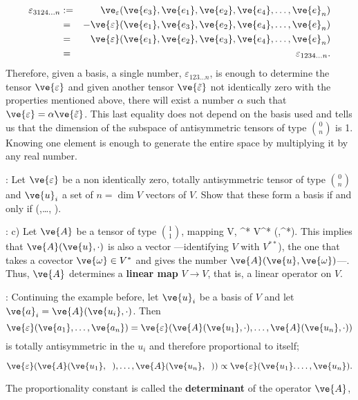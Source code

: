 \begin{eqnarray*} 
\varepsilon_{3124\ldots n} &:=& \ve_{\varepsilon}(\ve{e_3},\ve{e_1}, \ve{e_{2}}, \ve{e_{4}},\ldots,\ve{e}_n) \\
&=& -\ve{\varepsilon}(\ve{e_1},\ve{e_3}, \ve{e_{2}}, \ve{e_{4}},\ldots,\ve{e}_n) \\ 
&=& \ve{\varepsilon}(\ve{e_1},\ve{e_2}, \ve{e_{3}}, \ve{e_{4}},\ldots,\ve{e}_n) \\
&=&\varepsilon_{1234\ldots n}. 
\end{eqnarray*} 
% 
Therefore, given a basis, a single number, $\varepsilon_{123\ldots n}$, is enough to determine the tensor $\ve{\varepsilon}$ and given another tensor $\ve{\tilde{\varepsilon} }$ not identically zero with the properties mentioned above, there will exist a number $\alpha$ such that $\ve{\varepsilon} = \alpha\ve{\tilde{\varepsilon}}$. This last equality does not depend on the basis used and tells us that the dimension of the subspace of antisymmetric tensors of type ${0 \choose n}$ is 1. Knowing one element is enough to generate the entire space by multiplying it by any real number.

\ejer: Let $\ve{\varepsilon}$ be a non identically zero, totally antisymmetric tensor of type ${0 \choose n}$ and ${\ve{u}_i}$ a set of $n=\dim V$ vectors of $V$. Show that these form a basis if and only if 
\beq 
\ve{\varepsilon} (,\ldots, ). 
\eeq

\ejem: c) Let $\ve{ A}$ be a tensor of type ${1 \choose 1}$, mapping
\beq
{}\in V, \;\; ^* \in V^* \to {}(,^*)\in\re. 
\eeq 
This implies that $\ve{A}(\ve{u},\cdot)$ is also a vector ---identifying $V$ with $V^{**}$), the one that takes a covector $\ve{\omega} \in V^*$ and gives the number $\ve{A}(\ve{u},\ve{\omega})$---. 
Thus, $\ve{A}$ determines a \textbf{linear map} $V \to V$, that is, a linear operator on $V$.

\ejer: Continuing the example before, let ${\ve{u}_i}$ be a basis of $V$ and let $\ve{ a}_i = \ve{A}(\ve{u_i},\cdot)$. Then \[ \ve{\varepsilon}(\ve{a_1},\ldots,\ve{a_n})=\ve{\varepsilon}(\ve{A}(\ve{u_1}, \cdot),\ldots ,\ve{A}(\ve{u_n},\cdot)) \] is totally antisymmetric in the ${u_i}$ and therefore proportional to itself;

\[ 
\ve{\varepsilon}(\ve{A}(\ve{u_1},\;\;),\ldots ,\ve{A}(\ve{u_n},\;\;)) \propto \ve{\varepsilon}(\ve{u_1}. \ldots, \ve{u_n}). 
\] %

The proportionality constant is called the {\bf determinant}  of the operator $\ve{A}$,

